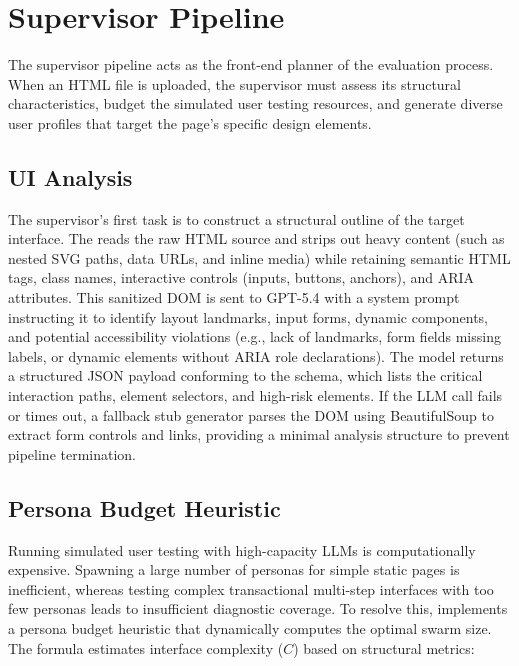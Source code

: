 \section{Supervisor Pipeline}
\label{sec:supervisor}

The supervisor pipeline acts as the front-end planner of the evaluation process. When an HTML file is uploaded, the supervisor must assess its structural characteristics, budget the simulated user testing resources, and generate diverse user profiles that target the page's specific design elements.

\subsection{UI Analysis}
\label{sec:ui-analysis}

The supervisor's first task is to construct a structural outline of the target interface. The  reads the raw HTML source and strips out heavy content (such as nested SVG paths, data URLs, and inline media) while retaining semantic HTML tags, class names, interactive controls (inputs, buttons, anchors), and ARIA attributes. This sanitized DOM is sent to GPT-5.4 with a system prompt instructing it to identify layout landmarks, input forms, dynamic components, and potential accessibility violations (e.g., lack of landmarks, form fields missing labels, or dynamic elements without ARIA role declarations). The model returns a structured JSON payload conforming to the  schema, which lists the critical interaction paths, element selectors, and high-risk elements. If the LLM call fails or times out, a fallback stub generator parses the DOM using BeautifulSoup to extract form controls and links, providing a minimal analysis structure to prevent pipeline termination.

\subsection{Persona Budget Heuristic}
\label{sec:persona-budget}

Running simulated user testing with high-capacity LLMs is computationally expensive. Spawning a large number of personas for simple static pages is inefficient, whereas testing complex transactional multi-step interfaces with too few personas leads to insufficient diagnostic coverage. To resolve this, \versimux{} implements a persona budget heuristic that dynamically computes the optimal swarm size. The formula estimates interface complexity ($C$) based on structural metrics:


